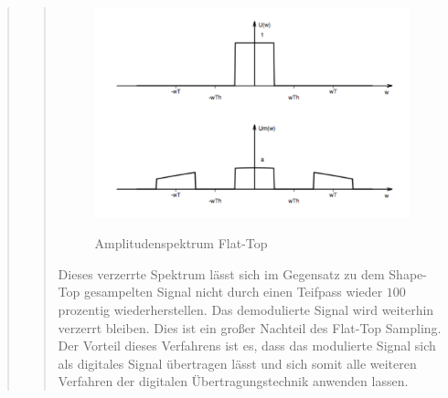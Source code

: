 \begin{quote}
\begin{quote}
        \begin{figure}[H]
        \centering
            \includegraphics[scale=0.7, trim = 0cm 0cm 0cm 0cm,
            clip]{./Bilder/AmplitudenspektrumFlat_Top}
                \caption{Amplitudenspektrum Flat-Top}
                \cite{AmplitudenspektrumFlat_Top}
        \end{figure}
        
        Dieses verzerrte Spektrum lässt sich im Gegensatz zu dem Shape-Top gesampelten Signal nicht durch einen Teifpass
        wieder $100$ prozentig wiederherstellen. Das demodulierte Signal wird weiterhin verzerrt bleiben. Dies ist ein
        großer Nachteil des Flat-Top Sampling.\\
        Der Vorteil dieses Verfahrens ist es, dass das modulierte Signal sich als digitales Signal übertragen lässt und
        sich somit alle weiteren Verfahren der digitalen Übertragungstechnik anwenden lassen. 
    
	\end{quote}%
\end{quote}%

